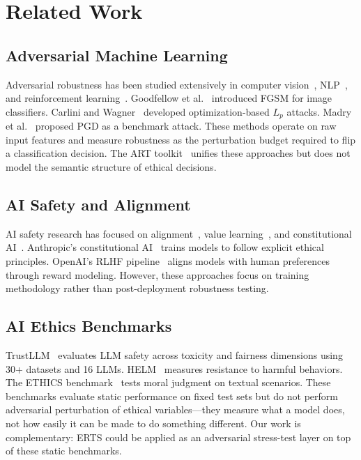 \documentclass[conference]{IEEEtran}
\begin{document}
\section{Related Work}

\subsection{Adversarial Machine Learning}
Adversarial robustness has been studied extensively in computer vision~\cite{goodfellow2015}, NLP~\cite{textattack2020}, and reinforcement learning~\cite{gleave2020}. Goodfellow et al.~\cite{goodfellow2015} introduced FGSM for image classifiers. Carlini and Wagner~\cite{carlini2017} developed optimization-based $L_p$ attacks. Madry et al.~\cite{madry2018} proposed PGD as a benchmark attack. These methods operate on raw input features and measure robustness as the perturbation budget required to flip a classification decision. The ART toolkit~\cite{art2018} unifies these approaches but does not model the semantic structure of ethical decisions.

\subsection{AI Safety and Alignment}
AI safety research has focused on alignment~\cite{russell2019}, value learning~\cite{hadfield2017}, and constitutional AI~\cite{bai2022}. Anthropic's constitutional AI~\cite{bai2022} trains models to follow explicit ethical principles. OpenAI's RLHF pipeline~\cite{ouyang2022} aligns models with human preferences through reward modeling. However, these approaches focus on training methodology rather than post-deployment robustness testing.

\subsection{AI Ethics Benchmarks}
TrustLLM~\cite{trustllm2024} evaluates LLM safety across toxicity and fairness dimensions using 30+ datasets and 16 LLMs. HELM~\cite{helm2023} measures resistance to harmful behaviors. The ETHICS benchmark~\cite{hendrycks2021} tests moral judgment on textual scenarios. These benchmarks evaluate static performance on fixed test sets but do not perform adversarial perturbation of ethical variables---they measure what a model does, not how easily it can be made to do something different. Our work is complementary: ERTS could be applied as an adversarial stress-test layer on top of these static benchmarks.
\end{document}
